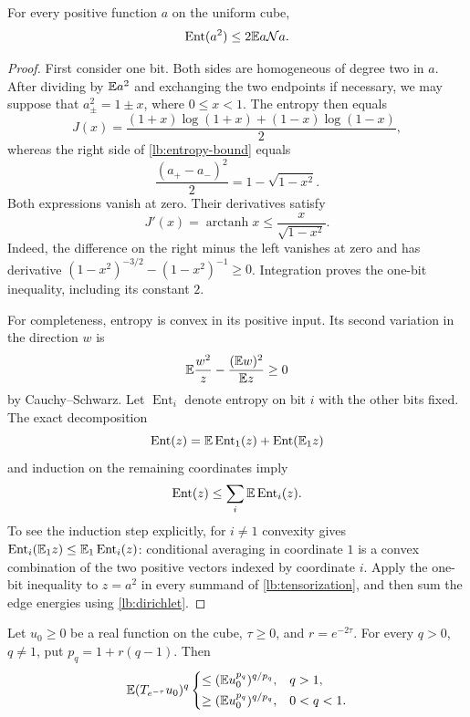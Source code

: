 \begin{lemma}\label{lb:log-sobolev}
For every positive function $a$ on the uniform cube,
\begin{equation}\label{lb:entropy-bound}
 \operatorname{Ent}(a^2)\le2\mathbb E a\mathcal Na.
\end{equation}
\end{lemma}

\begin{proof}
First consider one bit. Both sides are homogeneous of degree two in
$a$. After dividing by $\mathbb E a^2$ and exchanging the two endpoints if
necessary, we may suppose that $a_\pm^2=1\pm x$, where $0\le x<1$.
The entropy then equals
\[
 J(x)=\frac{(1+x)\log(1+x)+(1-x)\log(1-x)}2,
\]
whereas the right side of \eqref{lb:entropy-bound} equals
\[
 \frac{(a_+-a_-)^2}{2}=1-\sqrt{1-x^2}.
\]
Both expressions vanish at zero. Their derivatives satisfy
\[
 J'(x)=\operatorname{arctanh}x\le\frac{x}{\sqrt{1-x^2}}.
\]
Indeed, the difference on the right minus the left vanishes at zero
and has derivative
$(1-x^2)^{-3/2}-(1-x^2)^{-1}\ge0$.
Integration proves the one-bit inequality, including its constant $2$.

For completeness, entropy is convex in its positive input. Its second
variation in the direction $w$ is
\[
 \mathbb E\frac{w^2}{z}-\frac{(\mathbb E w)^2}{\mathbb E z}\ge0
\]
by Cauchy--Schwarz. Let $\operatorname{Ent}_i$ denote entropy on bit $i$
with the other bits fixed. The exact decomposition
\[
 \operatorname{Ent}(z)
 =\mathbb E\operatorname{Ent}_1(z)+\operatorname{Ent}(\mathbb E_1z)
\]
and induction on the remaining coordinates imply
\begin{equation}\label{lb:tensorization}
 \operatorname{Ent}(z)\le\sum_i\mathbb E\operatorname{Ent}_i(z).
\end{equation}
To see the induction step explicitly, for $i\ne1$ convexity gives
$\operatorname{Ent}_i(\mathbb E_1z)\le\mathbb E_1\operatorname{Ent}_i(z)$:
conditional averaging in coordinate $1$ is a convex combination of
the two positive vectors indexed by coordinate $i$.
Apply the one-bit inequality to $z=a^2$ in every summand of
\eqref{lb:tensorization}, and then sum the edge energies using
\eqref{lb:dirichlet}.
\end{proof}

\begin{lemma}\label{lb:norm-bounds}
Let $u_0\ge0$ be a real function on the cube, $\tau\ge0$, and
$r=e^{-2\tau}$. For every $q>0$, $q\ne1$, put
$p_q=1+r(q-1)$. Then
\begin{equation}\label{lb:norm-moments}
 \mathbb E(T_{e^{-\tau}}u_0)^q
 \begin{cases}
 \displaystyle\le(\mathbb E u_0^{p_q})^{q/p_q},&q>1,\\[2pt]
 \displaystyle\ge(\mathbb E u_0^{p_q})^{q/p_q},&0<q<1.
 \end{cases}
\end{equation}
\end{lemma}

